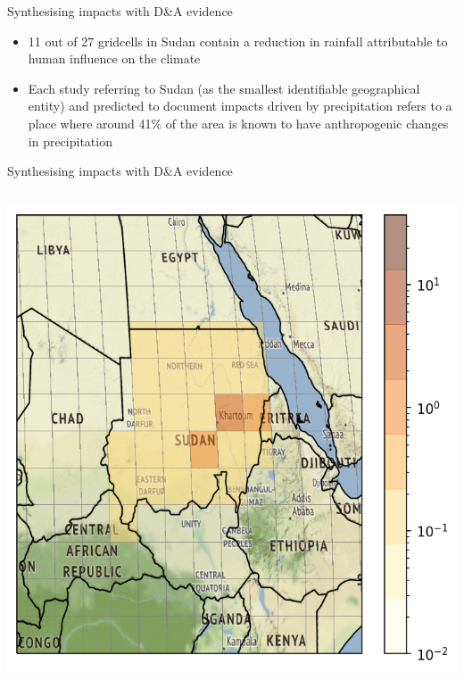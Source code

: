 \documentclass[9pt]{beamer}
\begin{document}
\begin{frame}{Synthesising impacts with D\&A evidence}
\begin{itemize}
	\item 11 out of 27 gridcells in Sudan contain a reduction in rainfall attributable to human influence on the climate
	\item Each study referring to Sudan (as the smallest identifiable geographical entity)  and predicted to document impacts driven by precipitation refers to a place where around 41\% of the area is known to have anthropogenic changes in precipitation
\end{itemize}
\end{frame}

\begin{frame}{Synthesising impacts with D\&A evidence}
\begin{columns}
\begin{column}{0.4\linewidth}
	\includegraphics[width=\linewidth]{../plots/maps/sudan_precipitation_studies.png}
\end{column}


\end{columns}
\end{frame}
\end{document}
